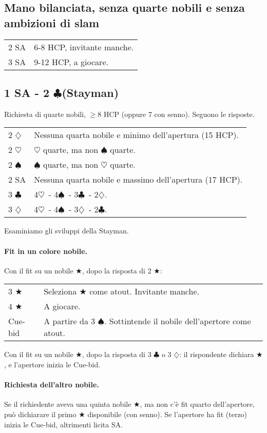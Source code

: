 \documentclass[a4paper,10pt]{article}
\renewcommand{\c}{$\clubsuit$\xspace}
\renewcommand{\d}{$\diamondsuit$\xspace}
\newcommand{\h}{$\heartsuit$\xspace}
\newcommand{\s}{$\spadesuit$\xspace}
\renewcommand{\j}{$\bigstar$\xspace}
\newcommand{\sa}{SA\xspace}
\newcommand{\smallspace}{\vskip0.3cm}
\newenvironment{twocol}
  {\smallspace\noindent\begin{tabular}{l p{0.8\textwidth}}}
  {\end{tabular}\smallspace}
\begin{document}
\subsection{Mano bilanciata, senza quarte nobili e senza ambizioni di slam}

\begin{twocol}
 2 \sa & 6-8 HCP, invitante manche.\\
 3 \sa & 9-12 HCP, a giocare.
\end{twocol}


\subsection{1 SA - 2 \c (Stayman)}

Richiesta di quarte nobili, $\geq 8$ HCP (oppure 7 con senno). Seguono le risposte.

\begin{twocol}
 2 \d & Nessuna quarta nobile e minimo dell'apertura (15 HCP).\\
 2 \h & \h quarte, ma non \s quarte.\\
 2 \s & \s quarte, ma non \h quarte.\\
 2 SA & Nessuna quarta nobile e massimo dell'apertura (17 HCP).\\
 3 \c & 4\h\ - 4\s\ - 3\c\ - 2\d.\\
 3 \d & 4\h\ - 4\s\ - 3\d\ - 2\c.\\
\end{twocol}

\noindent Esaminiamo gli sviluppi della Stayman.

\paragraph{Fit in un colore nobile.}

Con il fit su un nobile \j, dopo la risposta di 2 \j:
\begin{twocol}
 3 \j & Seleziona \j come atout. Invitante manche.\\
 4 \j & A giocare.\\
 Cue-bid & A partire da 3 \s. Sottintende il nobile dell'apertore come atout.\\
\end{twocol}

\noindent Con il fit su un nobile \j, dopo la risposta di 3 \c o 3 \d: il rispondente dichiara \j, e l'apertore inizia le Cue-bid.


\paragraph{Richiesta dell'altro nobile.}
Se il richiedente aveva una quinta nobile \j, ma non c'\`e fit quarto dell'apertore, può dichiarare il primo \j disponibile (con senno). Se l'apertore ha fit (terzo) inizia le Cue-bid, altrimenti licita \sa.
\end{document}
